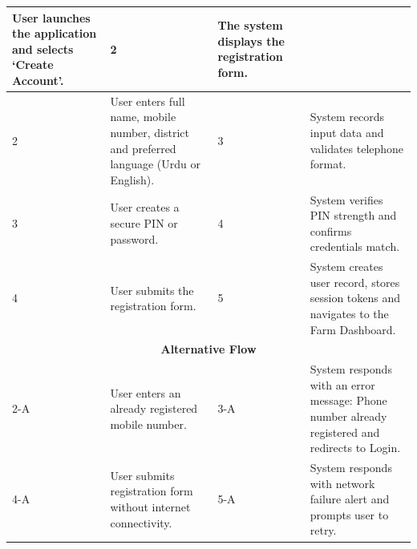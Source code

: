 \documentclass{FastFyp}
\begin{document}
\begin{table}[!ht]
\begin{tabular}{|lllll|}
  \multicolumn{2}{p{6.0cm}|}{User launches the application and selects `Create Account'.} &
  \multicolumn{1}{p{0.8cm}|}{2} &
  \multicolumn{1}{p{5.6cm}|}{The system displays the registration form.} \\ \hline
\multicolumn{1}{|p{0.8cm}|}{2} &
  \multicolumn{2}{p{6.0cm}|}{User enters full name, mobile number, district and preferred language (Urdu or English).} &
  \multicolumn{1}{p{0.8cm}|}{3} &
  \multicolumn{1}{p{5.6cm}|}{System records input data and validates telephone format.} \\ \hline
\multicolumn{1}{|p{0.8cm}|}{3} &
  \multicolumn{2}{p{6.0cm}|}{User creates a secure PIN or password.} &
  \multicolumn{1}{p{0.8cm}|}{4} &
  \multicolumn{1}{p{5.6cm}|}{System verifies PIN strength and confirms credentials match.} \\ \hline
\multicolumn{1}{|p{0.8cm}|}{4} &
  \multicolumn{2}{p{6.0cm}|}{User submits the registration form.} &
  \multicolumn{1}{p{0.8cm}|}{5} &
  \multicolumn{1}{p{5.6cm}|}{System creates user record, stores session tokens and navigates to the Farm Dashboard.} \\ \hline
\multicolumn{5}{|c|}{\textbf{Alternative Flow}} \\ \hline
\multicolumn{1}{|p{0.8cm}|}{2-A} &
  \multicolumn{2}{p{6.0cm}|}{User enters an already registered mobile number.} &
  \multicolumn{1}{p{0.8cm}|}{3-A} &
  \multicolumn{1}{p{5.6cm}|}{System responds with an error message: Phone number already registered and redirects to Login.} \\ \hline
\multicolumn{1}{|p{0.8cm}|}{4-A} &
  \multicolumn{2}{p{6.0cm}|}{User submits registration form without internet connectivity.} &
  \multicolumn{1}{p{0.8cm}|}{5-A} &
  \multicolumn{1}{p{5.6cm}|}{System responds with network failure alert and prompts user to retry.} \\ \hline
\end{tabular}
\end{table}
\end{document}
